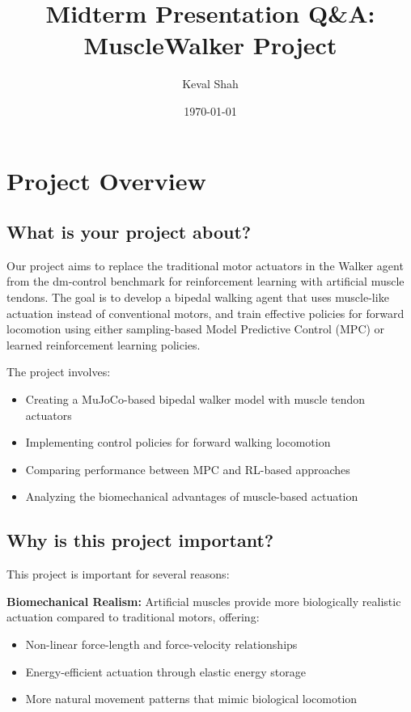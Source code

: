 \documentclass{article}
\title{Midterm Presentation Q\&A: MuscleWalker Project}
\author{Keval Shah}
\date{\today}
\begin{document}
\maketitle

\section{Project Overview}

\subsection{What is your project about?}

Our project aims to replace the traditional motor actuators in the Walker agent from the dm-control benchmark for reinforcement learning with artificial muscle tendons. The goal is to develop a bipedal walking agent that uses muscle-like actuation instead of conventional motors, and train effective policies for forward locomotion using either sampling-based Model Predictive Control (MPC) or learned reinforcement learning policies.

The project involves:
\begin{itemize}
    \item Creating a MuJoCo-based bipedal walker model with muscle tendon actuators
    \item Implementing control policies for forward walking locomotion
    \item Comparing performance between MPC and RL-based approaches
    \item Analyzing the biomechanical advantages of muscle-based actuation
\end{itemize}

\subsection{Why is this project important?}

This project is important for several reasons:

\textbf{Biomechanical Realism:} Artificial muscles provide more biologically realistic actuation compared to traditional motors, offering:
\begin{itemize}
    \item Non-linear force-length and force-velocity relationships
    \item Energy-efficient actuation through elastic energy storage
    \item More natural movement patterns that mimic biological locomotion
\end{itemize}
\end{document}
